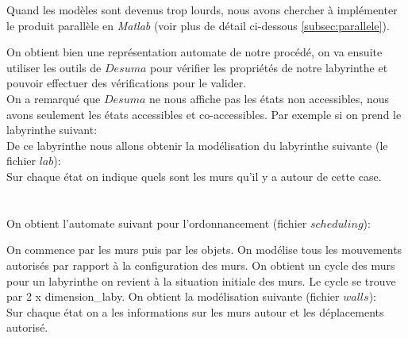 Quand les modèles sont devenus trop lourds, nous avons chercher à implémenter le produit parallèle en \emph{Matlab} (voir plus de détail ci-dessous \ref{subsec:parallele}).

On obtient bien une représentation automate de notre procédé, on va ensuite utiliser les outils de $Desuma$ pour vérifier les propriétés de notre labyrinthe et pouvoir effectuer des vérifications pour le valider.\\
On a remarqué que $Desuma$ ne nous affiche pas les états non accessibles, nous avons seulement les états accessibles et co-accessibles.
Par exemple si on prend le labyrinthe suivant:\\
De ce labyrinthe nous allons obtenir la modélisation du labyrinthe suivante (le fichier $lab$):\\
Sur chaque état on indique quels sont les murs qu'il y a autour de cette case.\\
\\
\\

On obtient l'automate suivant pour l’ordonnancement (fichier $scheduling$):


On commence par les murs puis par les objets. On modélise tous les mouvements autorisés par rapport à la configuration des murs. On obtient un cycle des murs pour un labyrinthe on revient à la situation initiale des murs. Le cycle se trouve par 2 x dimension\_laby. On obtient la modélisation suivante (fichier $walls$):\\
Sur chaque état on a les informations sur les murs autour et les déplacements autorisé.\\

